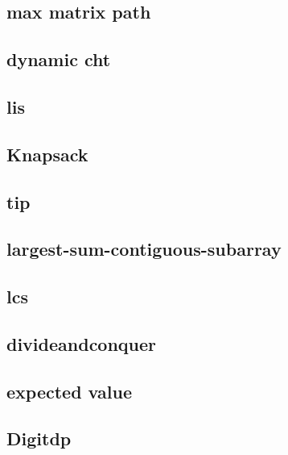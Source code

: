 \subsection{max matrix path}
\raggedbottom
\hrulefill
\subsection{dynamic cht}
\raggedbottom
\hrulefill
\subsection{lis}
\raggedbottom
\hrulefill
\subsection{Knapsack}
\raggedbottom
\hrulefill
\subsection{tip}
\raggedbottom
\hrulefill
\subsection{largest-sum-contiguous-subarray}
\raggedbottom
\hrulefill
\subsection{lcs}
\raggedbottom
\hrulefill
\subsection{divideandconquer}
\raggedbottom
\hrulefill
\subsection{expected value}
\raggedbottom
\hrulefill
\subsection{Digitdp}
\raggedbottom
\hrulefill


